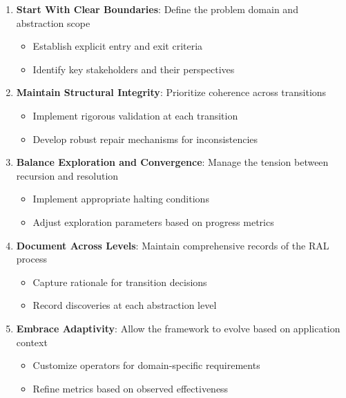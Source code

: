 \documentclass[
]{article}
\providecommand{\tightlist}{%
  \setlength{\itemsep}{0pt}\setlength{\parskip}{0pt}}
\begin{document}
\begin{enumerate}
\def\labelenumi{\arabic{enumi}.}
\tightlist
\item
  \textbf{Start With Clear Boundaries}: Define the problem domain and
  abstraction scope

  \begin{itemize}
  \tightlist
  \item
    Establish explicit entry and exit criteria
  \item
    Identify key stakeholders and their perspectives
  \end{itemize}
\item
  \textbf{Maintain Structural Integrity}: Prioritize coherence across
  transitions

  \begin{itemize}
  \tightlist
  \item
    Implement rigorous validation at each transition
  \item
    Develop robust repair mechanisms for inconsistencies
  \end{itemize}
\item
  \textbf{Balance Exploration and Convergence}: Manage the tension
  between recursion and resolution

  \begin{itemize}
  \tightlist
  \item
    Implement appropriate halting conditions
  \item
    Adjust exploration parameters based on progress metrics
  \end{itemize}
\item
  \textbf{Document Across Levels}: Maintain comprehensive records of the
  RAL process

  \begin{itemize}
  \tightlist
  \item
    Capture rationale for transition decisions
  \item
    Record discoveries at each abstraction level
  \end{itemize}
\item
  \textbf{Embrace Adaptivity}: Allow the framework to evolve based on
  application context

  \begin{itemize}
  \tightlist
  \item
    Customize operators for domain-specific requirements
  \item
    Refine metrics based on observed effectiveness
  \end{itemize}
\end{enumerate}
\end{document}
